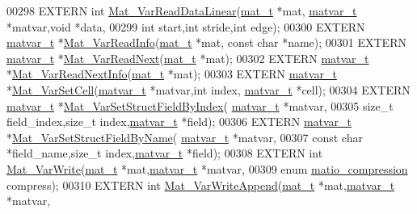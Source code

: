 \begin{DoxyCode}
00298 EXTERN \textcolor{keywordtype}{int}        \hyperlink{group___m_a_t_gaad61c8449a2106afa697280ff0ee9dd8}{Mat\_VarReadDataLinear}(\hyperlink{struct__mat__t}{mat\_t} *mat,
      \hyperlink{group___m_a_t_structmatvar__t}{matvar\_t} *matvar,\textcolor{keywordtype}{void} *data,
00299                       \textcolor{keywordtype}{int} start,\textcolor{keywordtype}{int} stride,\textcolor{keywordtype}{int} edge);
00300 EXTERN \hyperlink{group___m_a_t_structmatvar__t}{matvar\_t}  *\hyperlink{group___m_a_t_ga46da2e45ed96d3f1a6ec643757f2b086}{Mat\_VarReadInfo}(\hyperlink{struct__mat__t}{mat\_t} *mat, \textcolor{keyword}{const} \textcolor{keywordtype}{char} *name);
00301 EXTERN \hyperlink{group___m_a_t_structmatvar__t}{matvar\_t}  *\hyperlink{group___m_a_t_ga7c321d6aafd93916ba6c5655ad78e9ca}{Mat\_VarReadNext}(\hyperlink{struct__mat__t}{mat\_t} *mat);
00302 EXTERN \hyperlink{group___m_a_t_structmatvar__t}{matvar\_t}  *\hyperlink{group___m_a_t_ga72dd99330507b17177e22f9ed3bea5e6}{Mat\_VarReadNextInfo}(\hyperlink{struct__mat__t}{mat\_t} *mat);
00303 EXTERN \hyperlink{group___m_a_t_structmatvar__t}{matvar\_t}  *\hyperlink{group___m_a_t_ga1b2c36f27ba592206c22c584a30a3c5c}{Mat\_VarSetCell}(\hyperlink{group___m_a_t_structmatvar__t}{matvar\_t} *matvar,\textcolor{keywordtype}{int} index,
      \hyperlink{group___m_a_t_structmatvar__t}{matvar\_t} *cell);
00304 EXTERN \hyperlink{group___m_a_t_structmatvar__t}{matvar\_t}  *\hyperlink{group___m_a_t_ga3f077a005a8521c7a78927c1a1b4ae45}{Mat\_VarSetStructFieldByIndex}(
      \hyperlink{group___m_a_t_structmatvar__t}{matvar\_t} *matvar,
00305                       \textcolor{keywordtype}{size\_t} field\_index,\textcolor{keywordtype}{size\_t} index,\hyperlink{group___m_a_t_structmatvar__t}{matvar\_t} *field);
00306 EXTERN \hyperlink{group___m_a_t_structmatvar__t}{matvar\_t}  *\hyperlink{group___m_a_t_ga702f2b853c605c94a8af50555fc7183b}{Mat\_VarSetStructFieldByName}(
      \hyperlink{group___m_a_t_structmatvar__t}{matvar\_t} *matvar,
00307                       \textcolor{keyword}{const} \textcolor{keywordtype}{char} *field\_name,\textcolor{keywordtype}{size\_t} index,\hyperlink{group___m_a_t_structmatvar__t}{matvar\_t} *field);
00308 EXTERN \textcolor{keywordtype}{int}        \hyperlink{group___m_a_t_ga4bd3eba12df415d8226e27c457fbbb0b}{Mat\_VarWrite}(\hyperlink{struct__mat__t}{mat\_t} *mat,\hyperlink{group___m_a_t_structmatvar__t}{matvar\_t} *matvar,
00309                       \textcolor{keyword}{enum} \hyperlink{group___m_a_t_ga768c318af97bd2567758ecb001ceb7f4}{matio\_compression} compress);
00310 EXTERN \textcolor{keywordtype}{int}        \hyperlink{group___m_a_t_ga9402f3f2fbec82fdb66bf1479c689727}{Mat\_VarWriteAppend}(\hyperlink{struct__mat__t}{mat\_t} *mat,\hyperlink{group___m_a_t_structmatvar__t}{matvar\_t} *matvar,

\end{DoxyCode}
